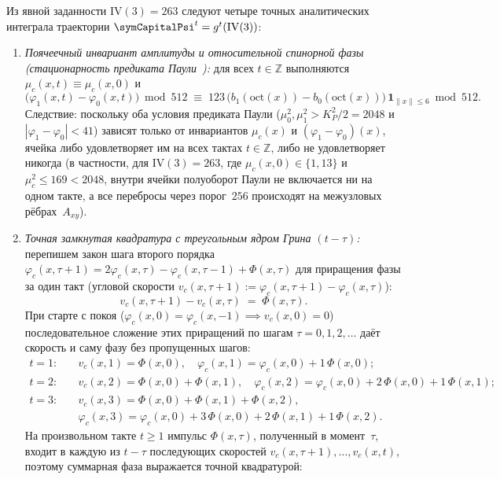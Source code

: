 \begin{enumerate}[label=\textbf{Z\arabic*.},leftmargin=*]
  Из явной заданности $\mathrm{IV}(3)=263$ следуют четыре точных аналитических интеграла траектории $\symCapitalPsi^t = g^t(\mathrm{IV}(3))$:
  \begin{enumerate}[label=(\alph*),nosep]
  \item \emph{Поячеечный инвариант амплитуды и относительной спинорной фазы (стационарность предиката Паули~):}
    для всех $t\in\mathbb{Z}$ выполняются $\mu_c(x,t) \equiv \mu_c(x,0)$ и
    \[
      \bigl(\varphi_1(x,t)-\varphi_0(x,t)\bigr)\bmod 512
      \;\equiv\;
      123\,\bigl(b_1(\mathrm{oct}(x))-b_0(\mathrm{oct}(x))\bigr)\,\mathbf{1}_{\|x\|\le 6}\bmod 512.
    \]
    Следствие: поскольку оба условия предиката Паули ($\mu_0^2,\mu_1^2 > K_P^2/2 = 2048$ и $|\varphi_1-\varphi_0| < 41$) зависят только от инвариантов $\mu_c(x)$ и $(\varphi_1-\varphi_0)(x)$, ячейка либо удовлетворяет им на всех тактах $t\in\mathbb{Z}$, либо не удовлетворяет никогда (в частности, для $\mathrm{IV}(3)=263$, где $\mu_c(x,0)\in\{1,13\}$ и $\mu_c^2\le 169 < 2048$, внутри ячейки полуоборот Паули не включается ни на одном такте, а все перебросы через порог~$256$ происходят на межузловых рёбрах~$A_{xy}$).
  \item \emph{Точная замкнутая квадратура с треугольным ядром Грина $(t-\tau)$:}
    перепишем закон шага второго порядка $\varphi_c(x,\tau+1) = 2\varphi_c(x,\tau) - \varphi_c(x,\tau-1) + \Phi(x,\tau)$ для приращения фазы за один такт (угловой скорости $v_c(x,\tau+1) := \varphi_c(x,\tau+1) - \varphi_c(x,\tau)$):
    \[
      v_c(x,\tau+1) - v_c(x,\tau) \;=\; \Phi(x,\tau).
    \]
    При старте с покоя ($\varphi_c(x,0)=\varphi_c(x,-1) \implies v_c(x,0) = 0$) последовательное сложение этих приращений по шагам $\tau = 0,1,2,\dots$ даёт скорость и саму фазу без пропущенных шагов:
    \begin{align*}
      t=1\colon &\quad v_c(x,1) = \Phi(x,0),\quad
        \varphi_c(x,1) = \varphi_c(x,0) + 1\,\Phi(x,0);\\
      t=2\colon &\quad v_c(x,2) = \Phi(x,0) + \Phi(x,1),\quad
        \varphi_c(x,2) = \varphi_c(x,0) + 2\,\Phi(x,0) + 1\,\Phi(x,1);\\
      t=3\colon &\quad v_c(x,3) = \Phi(x,0) + \Phi(x,1) + \Phi(x,2),\\
        &\quad \varphi_c(x,3) = \varphi_c(x,0) + 3\,\Phi(x,0) + 2\,\Phi(x,1) + 1\,\Phi(x,2).
    \end{align*}
    На произвольном такте $t\ge 1$ импульс $\Phi(x,\tau)$, полученный в момент~$\tau$, входит в каждую из $t-\tau$ последующих скоростей $v_c(x,\tau+1),\dots,v_c(x,t)$, поэтому суммарная фаза выражается точной квадратурой:

\end{enumerate}
\end{enumerate}
